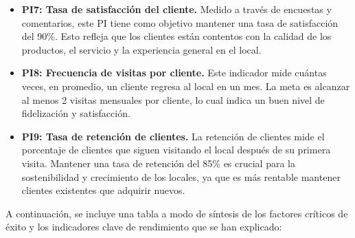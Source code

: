 \documentclass[12pt]{opticajnl}
\begin{document}
\begin{itemize}
    \item \textbf{PI7: Tasa de satisfacción del cliente.}  
    Medido a través de encuestas y comentarios, este PI tiene como objetivo mantener una tasa de satisfacción del 90\%. Esto refleja que los clientes están contentos con la calidad de los productos, el servicio y la experiencia general en el local.
    
    \item \textbf{PI8: Frecuencia de visitas por cliente.}  
    Este indicador mide cuántas veces, en promedio, un cliente regresa al local en un mes. La meta es alcanzar al menos 2 visitas mensuales por cliente, lo cual indica un buen nivel de fidelización y satisfacción.
    
    \item \textbf{PI9: Tasa de retención de clientes.}  
    La retención de clientes mide el porcentaje de clientes que siguen visitando el local después de su primera visita. Mantener una tasa de retención del 85\% es crucial para la sostenibilidad y crecimiento de los locales, ya que es más rentable mantener clientes existentes que adquirir nuevos.
\end{itemize}

\vspace{0.3cm}


A continuación, se incluye una tabla a modo de síntesis de los factores críticos de éxito y los indicadores clave de rendimiento que se han explicado:
\end{document}
